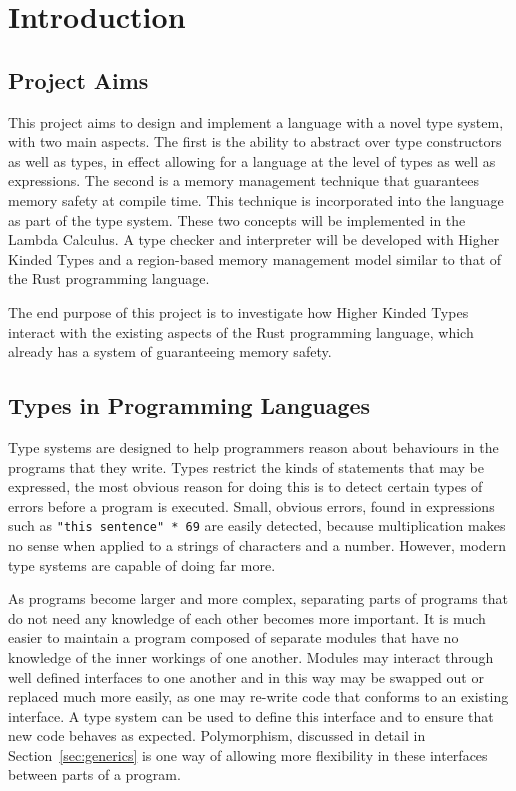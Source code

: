 \chapter{Introduction}\label{sec:intro}

\section{Project Aims}
This project aims to design and implement a language with a novel type system,
with two main aspects. The first is the ability to abstract over type
constructors as well as types, in effect allowing for a language at the level
of types as well as expressions. The second is a memory management technique
that guarantees memory safety at compile time. This technique is incorporated
into the language as part of the type system.  These two concepts will be
implemented in the Lambda Calculus. A type checker and interpreter will be
developed with Higher Kinded Types and a region-based memory management model
similar to that of the Rust programming language.

The end purpose of this project is to investigate how Higher Kinded Types
interact with the existing aspects of the Rust programming language, which already has
a system of guaranteeing memory safety.

\section{Types in Programming Languages}
Type systems are designed to help programmers reason
about behaviours in the programs that they write. Types restrict the kinds of
statements that may be expressed, the most obvious reason for doing this is to
detect certain types of errors before a program is executed. Small, obvious errors, found in expressions
such as \lstinline{"this sentence" * 69} are easily detected, because
multiplication makes no sense when applied to a strings of characters and a number.
However, modern type systems are capable of doing far more. 

As programs become larger and more complex, separating parts of programs that
do not need any knowledge of each other becomes more important. It is much
easier to maintain a program composed of separate modules that have no
knowledge of the inner workings of one another. Modules may interact through
well defined interfaces to one another and in this way may be swapped out or
replaced much more easily, as one may re-write code that conforms to an
existing interface. A type system can be used to define this interface and to
ensure that new code behaves as expected. Polymorphism, discussed in detail in
Section~\ref{sec:generics} is one way of allowing more flexibility in these
interfaces between parts of a program.

